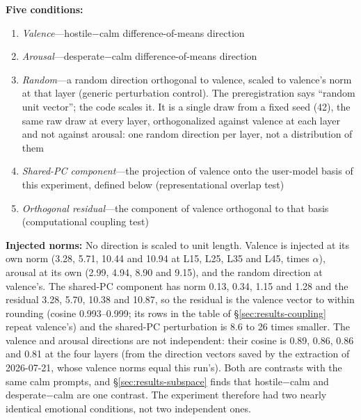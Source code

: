 \documentclass[11pt,a4paper]{article}
\begin{document}
\textbf{Five conditions:}
\begin{enumerate}
  \item \textit{Valence}---hostile$-$calm difference-of-means direction
  \item \textit{Arousal}---desperate$-$calm difference-of-means direction
  \item \textit{Random}---a random direction orthogonal to valence, scaled to valence's norm at that layer (generic perturbation control). The preregistration says ``random unit vector''; the code scales it. It is a single draw from a fixed seed (42), the same raw draw at every layer, orthogonalized against valence at each layer and not against arousal: one random direction per layer, not a distribution of them
  \item \textit{Shared-PC component}---the projection of valence onto the user-model basis of this experiment, defined below (representational overlap test)
  \item \textit{Orthogonal residual}---the component of valence orthogonal to that basis (computational coupling test)
\end{enumerate}

\textbf{Injected norms:} No direction is scaled to unit length. Valence is injected at its own norm (3.28, 5.71, 10.44 and 10.94 at L15, L25, L35 and L45, times $\alpha$), arousal at its own (2.99, 4.94, 8.90 and 9.15), and the random direction at valence's. The shared-PC component has norm 0.13, 0.34, 1.15 and 1.28 and the residual 3.28, 5.70, 10.38 and 10.87, so the residual is the valence vector to within rounding (cosine 0.993--0.999; its rows in the table of \S\ref{sec:results-coupling} repeat valence's) and the shared-PC perturbation is 8.6 to 26 times smaller. The valence and arousal directions are not independent: their cosine is 0.89, 0.86, 0.86 and 0.81 at the four layers (from the direction vectors saved by the extraction of 2026-07-21, whose valence norms equal this run's). Both are contrasts with the same calm prompts, and \S\ref{sec:results-subspace} finds that hostile$-$calm and desperate$-$calm are one contrast. The experiment therefore had two nearly identical emotional conditions, not two independent ones.
\end{document}
